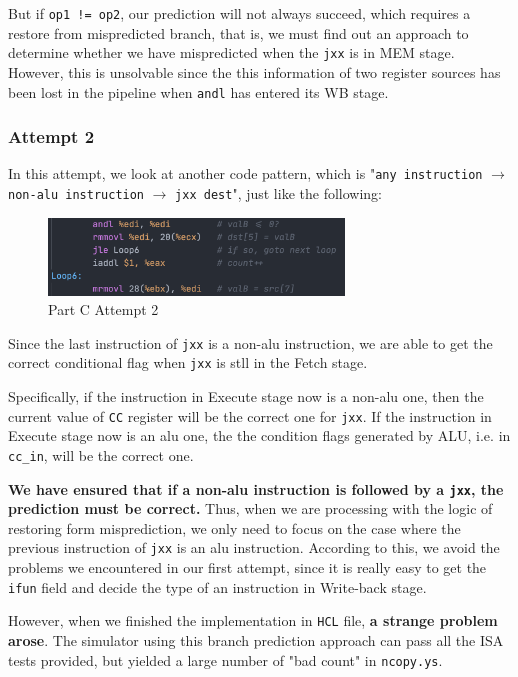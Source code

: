 \documentclass{article}
\begin{document}
But if \texttt{op1 != op2}, our prediction will not always succeed, which requires a restore from mispredicted branch, that is, we must find out an approach to determine whether we have mispredicted when the \texttt{jxx} is in MEM stage. However, this is unsolvable since the this information of two register sources has been lost in the pipeline when \texttt{andl} has entered its WB stage.
\subsubsection{Attempt 2}
In this attempt, we look at another code pattern, which is "\texttt{any instruction} $\rightarrow$ \texttt{non-alu instruction} $\rightarrow$ \texttt{jxx dest}", just like the following:
\begin{figure}[H] %
        \centering %
        \includegraphics[width=0.7\textwidth]{partC-attempt2.png} %
        \caption{Part C Attempt 2} %
        \label{Fig.partC-attempt2} %
\end{figure}
Since the last instruction of \texttt{jxx} is a non-alu instruction, we are able to get the correct conditional flag when \texttt{jxx} is stll in the Fetch stage. 

Specifically, if the instruction in Execute stage now is a non-alu one, then the current value of \texttt{CC} register will be the correct one for \texttt{jxx}. If the instruction in Execute stage now is an alu one, the the condition flags generated by ALU, i.e. in \texttt{cc\_in}, will be the correct one. 

\textbf{We have ensured that if a non-alu instruction is followed by a \texttt{jxx}, the prediction must be correct.} Thus, when we are processing with the logic of restoring form misprediction, we only need to focus on the case where the previous instruction of \texttt{jxx} is an alu instruction. According to this, we avoid the problems we encountered in our first attempt, since it is really easy to get the \texttt{ifun} field and decide the type of an instruction in Write-back stage.

However, when we finished the implementation in \texttt{HCL} file, \textbf{a strange problem arose}. The simulator using this branch prediction approach can pass all the ISA tests provided, but yielded a large number of "bad count" in \texttt{ncopy.ys}. 
\end{document}
